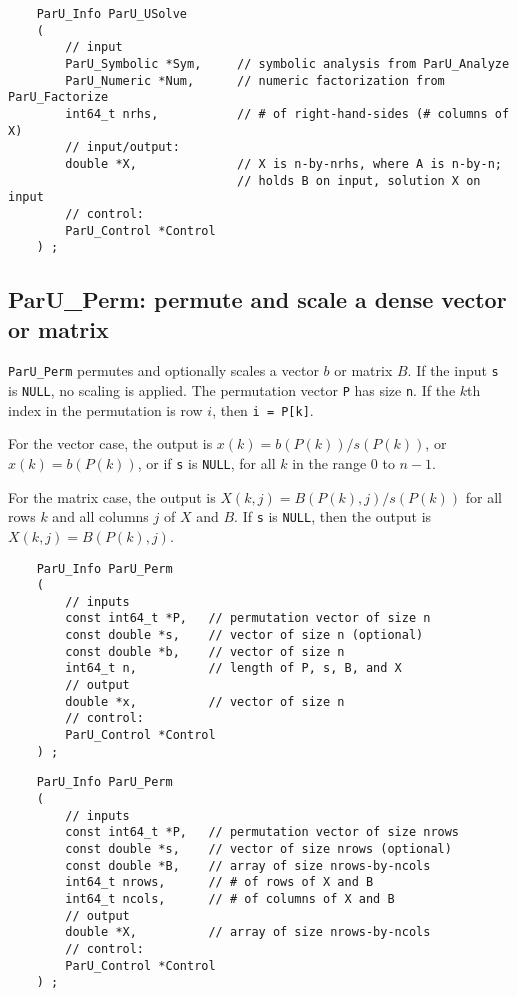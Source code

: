 \documentclass[12pt]{article}
\begin{document}
    {\footnotesize
    \begin{verbatim}
    ParU_Info ParU_USolve
    (
        // input
        ParU_Symbolic *Sym,     // symbolic analysis from ParU_Analyze
        ParU_Numeric *Num,      // numeric factorization from ParU_Factorize
        int64_t nrhs,           // # of right-hand-sides (# columns of X)
        // input/output:
        double *X,              // X is n-by-nrhs, where A is n-by-n;
                                // holds B on input, solution X on input
        // control:
        ParU_Control *Control
    ) ; \end{verbatim} }

\subsection{{\sf ParU\_Perm}: permute and scale a dense vector or matrix}
\label{perm}

    \verb'ParU_Perm' permutes and optionally scales a vector $b$ or matrix $B$.
    If the input \verb's' is \verb'NULL', no scaling is applied.  The
    permutation vector \verb'P' has size \verb'n'.  If the $k$th index in the
    permutation is row $i$, then \verb'i = P[k]'.

    For the vector case, the output is $x(k) = b(P(k)) / s(P(k))$, or
    $x(k) = b(P(k))$, or if \verb's' is \verb'NULL', for all $k$ in the range 0
    to $n-1$.

    For the matrix case, the output is $X(k,j) = B(P(k),j) / s(P(k))$ for all
    rows $k$ and all columns $j$ of $X$ and $B$.  If \verb's' is \verb'NULL',
    then the output is $X(k,j) = B(P(k),j)$.

    {\footnotesize
    \begin{verbatim}
    ParU_Info ParU_Perm
    (
        // inputs
        const int64_t *P,   // permutation vector of size n
        const double *s,    // vector of size n (optional)
        const double *b,    // vector of size n
        int64_t n,          // length of P, s, B, and X
        // output
        double *x,          // vector of size n
        // control:
        ParU_Control *Control
    ) ; \end{verbatim} }

    {\footnotesize
    \begin{verbatim}
    ParU_Info ParU_Perm
    (
        // inputs
        const int64_t *P,   // permutation vector of size nrows
        const double *s,    // vector of size nrows (optional)
        const double *B,    // array of size nrows-by-ncols
        int64_t nrows,      // # of rows of X and B
        int64_t ncols,      // # of columns of X and B
        // output
        double *X,          // array of size nrows-by-ncols
        // control:
        ParU_Control *Control
    ) ; \end{verbatim} }
\end{document}
